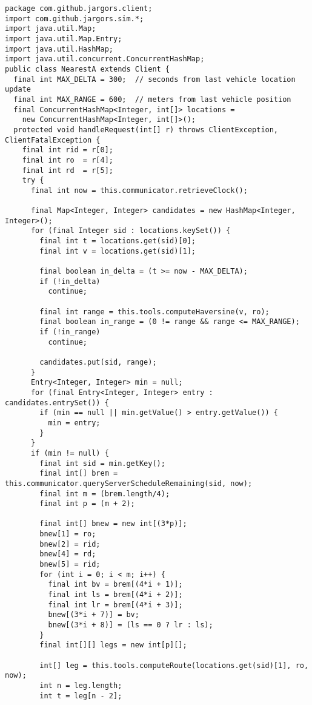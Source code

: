 {
\small
\begin{verbatim}
package com.github.jargors.client;
import com.github.jargors.sim.*;
import java.util.Map;
import java.util.Map.Entry;
import java.util.HashMap;
import java.util.concurrent.ConcurrentHashMap;
public class NearestA extends Client {
  final int MAX_DELTA = 300;  // seconds from last vehicle location update
  final int MAX_RANGE = 600;  // meters from last vehicle position
  final ConcurrentHashMap<Integer, int[]> locations =
    new ConcurrentHashMap<Integer, int[]>();
  protected void handleRequest(int[] r) throws ClientException, ClientFatalException {
    final int rid = r[0];
    final int ro  = r[4];
    final int rd  = r[5];
    try {
      final int now = this.communicator.retrieveClock();

      final Map<Integer, Integer> candidates = new HashMap<Integer, Integer>();
      for (final Integer sid : locations.keySet()) {
        final int t = locations.get(sid)[0];
        final int v = locations.get(sid)[1];

        final boolean in_delta = (t >= now - MAX_DELTA);
        if (!in_delta)
          continue;

        final int range = this.tools.computeHaversine(v, ro);
        final boolean in_range = (0 != range && range <= MAX_RANGE);
        if (!in_range)
          continue;

        candidates.put(sid, range);
      }
      Entry<Integer, Integer> min = null;
      for (final Entry<Integer, Integer> entry : candidates.entrySet()) {
        if (min == null || min.getValue() > entry.getValue()) {
          min = entry;
        }
      }
      if (min != null) {
        final int sid = min.getKey();
        final int[] brem = this.communicator.queryServerScheduleRemaining(sid, now);
        final int m = (brem.length/4);
        final int p = (m + 2);

        final int[] bnew = new int[(3*p)];
        bnew[1] = ro;
        bnew[2] = rid;
        bnew[4] = rd;
        bnew[5] = rid;
        for (int i = 0; i < m; i++) {
          final int bv = brem[(4*i + 1)];
          final int ls = brem[(4*i + 2)];
          final int lr = brem[(4*i + 3)];
          bnew[(3*i + 7)] = bv;
          bnew[(3*i + 8)] = (ls == 0 ? lr : ls);
        }
        final int[][] legs = new int[p][];

        int[] leg = this.tools.computeRoute(locations.get(sid)[1], ro, now);
        int n = leg.length;
        int t = leg[n - 2];


\end{verbatim}}
